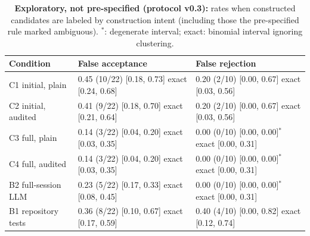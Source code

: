 \begin{table}[t]\centering\footnotesize
\caption{\textbf{Exploratory, not pre-specified (protocol v0.3):} rates when constructed candidates are labeled by construction intent (including those the pre-specified rule marked ambiguous). $^{*}$: degenerate interval; exact: binomial interval ignoring clustering.}\label{tab:sensitivity}
\begin{tabular}{lll}\toprule Condition & False acceptance & False rejection \\\midrule
C1 initial, plain & 0.45 (10/22) [0.18, 0.73] {\scriptsize exact [0.24, 0.68]} & 0.20 (2/10) [0.00, 0.67] {\scriptsize exact [0.03, 0.56]} \\
C2 initial, audited & 0.41 (9/22) [0.18, 0.70] {\scriptsize exact [0.21, 0.64]} & 0.20 (2/10) [0.00, 0.67] {\scriptsize exact [0.03, 0.56]} \\
C3 full, plain & 0.14 (3/22) [0.04, 0.20] {\scriptsize exact [0.03, 0.35]} & 0.00 (0/10) [0.00, 0.00]$^{*}$ {\scriptsize exact [0.00, 0.31]} \\
C4 full, audited & 0.14 (3/22) [0.04, 0.20] {\scriptsize exact [0.03, 0.35]} & 0.00 (0/10) [0.00, 0.00]$^{*}$ {\scriptsize exact [0.00, 0.31]} \\
B2 full-session LLM & 0.23 (5/22) [0.17, 0.33] {\scriptsize exact [0.08, 0.45]} & 0.00 (0/10) [0.00, 0.00]$^{*}$ {\scriptsize exact [0.00, 0.31]} \\
B1 repository tests & 0.36 (8/22) [0.10, 0.67] {\scriptsize exact [0.17, 0.59]} & 0.40 (4/10) [0.00, 0.82] {\scriptsize exact [0.12, 0.74]} \\
\bottomrule\end{tabular}\end{table}
